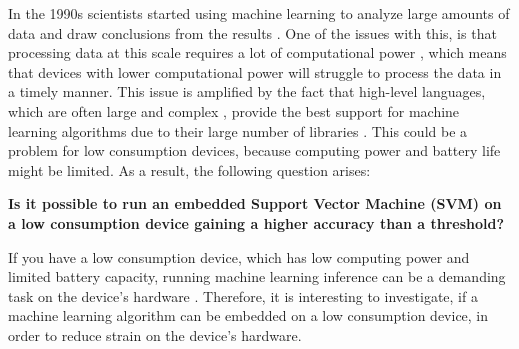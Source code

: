 In the 1990s scientists started using machine learning to analyze large amounts of data and draw conclusions from the results \cite{marr2016short}.
One of the issues with this, is that processing data at this scale requires a lot of computational power \cite{garcia2019estimation}, which means that devices with lower computational power will struggle to process the data in a timely manner.
This issue is amplified by the fact that high-level languages, which are often large and complex , provide the best support for machine learning algorithms due to their large number of libraries \cite{top5mllangs}.
This could be a problem for low consumption devices, because computing power and battery life might be limited. As a result, the following question arises: 
\begin{center}
\textbf{Is it possible to run an embedded Support Vector Machine (SVM) on a low consumption device gaining a higher accuracy than a threshold?}
\end{center}
If you have a low consumption device, which has low computing power and limited battery capacity, running machine learning inference can be a demanding task on the device's hardware \cite{batterylifewearablesensors}. Therefore, it is interesting to investigate, if a machine learning algorithm can be embedded on a low consumption device, in order to reduce strain on the device's hardware.\\



